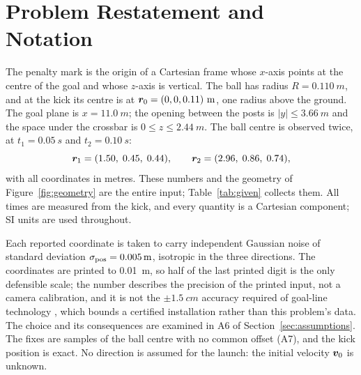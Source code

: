 \section{Problem Restatement and Notation}
\label{sec:problem}

The penalty mark is the origin of a Cartesian frame whose $x$-axis points at
the centre of the goal and whose $z$-axis is vertical. The ball has radius
$R=\SI{0.110}{m}$, and at the kick its centre is at
$\vect{r}_0=(0,0,0.11)~\si{m}$, one radius above the ground. The goal plane is
$x=\SI{11.0}{m}$; the opening between the posts is $|y|\le\SI{3.66}{m}$ and the
space under the crossbar is $0\le z\le\SI{2.44}{m}$. The ball centre is
observed twice, at $t_1=\SI{0.05}{s}$ and $t_2=\SI{0.10}{s}$:
\begin{equation}
  \vect{r}_1 = (1.50,\;0.45,\;0.44), \qquad
  \vect{r}_2 = (2.96,\;0.86,\;0.74),
  \label{eq:fixes}
\end{equation}
with all coordinates in metres. These numbers and the geometry of
Figure~\ref{fig:geometry} are the entire input; Table~\ref{tab:given}
collects them. All times are measured from the kick, and every quantity is a
Cartesian component; SI units are used throughout.

Each reported coordinate is taken to carry independent Gaussian noise of
standard deviation $\sigma_{\rm pos}=\SI{0.005}{m}$, isotropic in the three
directions. The coordinates are printed to \SI{0.01}{m}, so half of the last
printed digit is the only defensible scale; the number describes the precision
of the printed input, not a camera calibration, and it is not the
$\pm\SI{1.5}{cm}$ accuracy required of goal-line technology
\citep{fifa2020glt}, which bounds a certified installation rather than this
problem's data. The choice and its consequences are examined in A6 of
Section~\ref{sec:assumptions}. The fixes are samples of the ball centre with
no common offset (A7), and the kick position is exact. No direction is assumed
for the launch: the initial velocity $\vect{v}_0$ is unknown.

